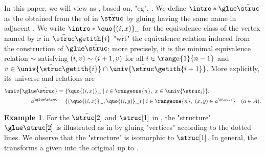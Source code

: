 \documentclass[10pt,a4paper]{article}
\theoremstyle{definition}
\newtheorem{example}[theorem]{Example}
\theoremstyle{remark}
\DeclarePairedDelimiter\set{\{}{\}}
\DeclarePairedDelimiter\tuple{(}{)}
\newcommand{\mul}[1]{\bar{#1}}
\begin{document}
%
In this paper, we will view  as \emph{}, based on, "eg", \cite{nakamuraPartialDerivativesGraphs2017,nakamuraDerivativesGraphsPositive2025}.
\AP {}
We define $\intro*\glue \mul{\struc}$ \cite[Definition 5.1]{nakamuraDerivativesGraphsPositive2025} as the 
obtained from the  of  in $\mul{\struc}$ by gluing  having the same name in adjacent .
We write $\intro*\quo{\tuple{i, x}}_{\sim}$ for the 
equivalence class of the vertex named by $x$ in $\mul{\struc}\getith{i}$ "wrt" the equivalence relation induced from the construction of $\glue \mul{\struc}$; more precisely, it is the minimal equivalence relation $\sim$
satisfying $\tuple{i, v} \sim \tuple{i+1, v}$ for all $i \in \range{1}{n-1}$ and $v \in \univ{\mul{\struc}\getith{i}} \cap \univ{\mul{\struc}\getith{i+1}}$.
More explicitly, its universe and relations are
\begin{align*}
\univ{\glue\mul{\struc}}
&= \set{\quo{\tuple{i,x}}_{\sim} \mid i \in \rangeone{n},\ x \in \univ{\struc_i}},\\
a^{\glue\mul{\struc}}
&= \set{\tuple{\quo{\tuple{i,x}}_{\sim},\quo{\tuple{i,y}}_{\sim}} \mid i \in \rangeone{n},\ \tuple{x,y} \in a^{\struc_i}}
\quad (a \in A).
\end{align*}
\begin{example}
For the $\mul{\struc[2]}$ and $\struc[1]$ in ,
the "structure" $\glue \mul{\struc[2]}$ is illustrated as in  by gluing "vertices" according to the dotted lines.
We observe that the "structure" is isomorphic to $\struc[1]$.
In general, the  transforms a given  into the original  up to .
\end{example}
\end{document}

